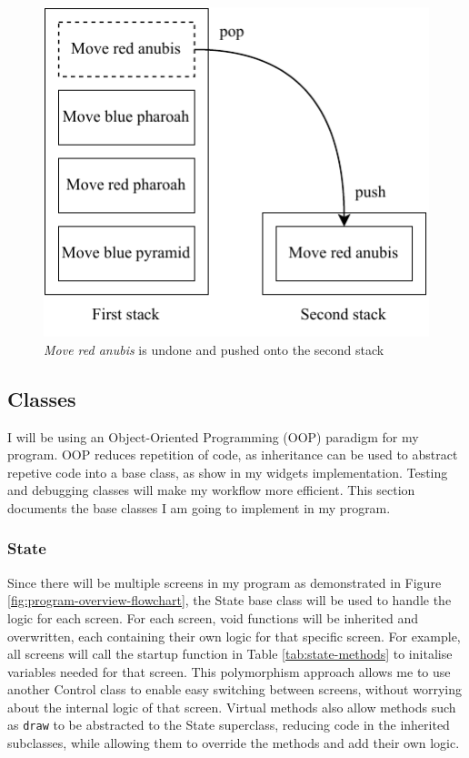 \documentclass[../main/main.tex]{subfiles}
\begin{document}
\begin{figure}[H]
    \centering
    \includegraphics[width=0.6\columnwidth]{../design/assets/stack.pdf}
    \caption{\textit{Move red anubis} is undone and pushed onto the second stack}
    \label{fig:stack-diagram}
\end{figure}

\subsection{Classes}
I will be using an Object-Oriented Programming (OOP) paradigm for my program. OOP reduces repetition of code, as inheritance can be used to abstract repetive code into a base class, as show in my widgets implementation. Testing and debugging classes will make my workflow more efficient. This section documents the base classes I am going to implement in my program.

\subsubsection*{State}
Since there will be multiple screens in my program as demonstrated in Figure \ref{fig:program-overview-flowchart}, the State base class will be used to handle the logic for each screen. For each screen, void functions will be inherited and overwritten, each containing their own logic for that specific screen. For example, all screens will call the startup function in Table \ref{tab:state-methods} to initalise variables needed for that screen. This polymorphism approach allows me to use another Control class to enable easy switching between screens, without worrying about the internal logic of that screen. Virtual methods also allow methods such as \lstinline[language=Python]{draw} to be abstracted to the State superclass, reducing code in the inherited subclasses, while allowing them to override the methods and add their own logic.
\end{document}
